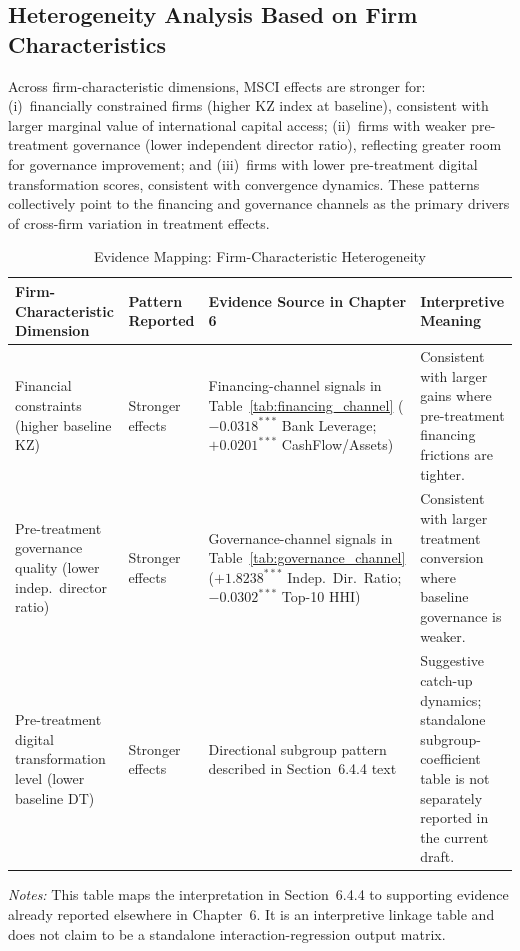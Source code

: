 \subsection{Heterogeneity Analysis Based on Firm Characteristics}

Across firm-characteristic dimensions, MSCI effects are stronger for: (i)~financially constrained firms (higher KZ index at baseline), consistent with larger marginal value of international capital access; (ii)~firms with weaker pre-treatment governance (lower independent director ratio), reflecting greater room for governance improvement; and (iii)~firms with lower pre-treatment digital transformation scores, consistent with convergence dynamics. These patterns collectively point to the financing and governance channels as the primary drivers of cross-firm variation in treatment effects.

\begin{table}[htbp]
\centering
\caption{Evidence Mapping: Firm-Characteristic Heterogeneity}
\label{tab:firm_characteristic_heterogeneity}
\small
\setlength{\tabcolsep}{4pt}
\begin{tabularx}{\textwidth}{>{\raggedright\arraybackslash}p{}>{\centering\arraybackslash}p{}>{\raggedright\arraybackslash}p{}>{\raggedright\arraybackslash}X}
\toprule
\textbf{Firm-Characteristic Dimension} & \textbf{Pattern Reported} & \textbf{Evidence Source in Chapter 6} & \textbf{Interpretive Meaning} \\
\midrule
Financial constraints (higher baseline KZ) & Stronger effects & Financing-channel signals in Table~\ref{tab:financing_channel} ($-0.0318^{***}$ Bank Leverage; $+0.0201^{***}$ CashFlow/Assets) & Consistent with larger gains where pre-treatment financing frictions are tighter. \\
Pre-treatment governance quality (lower indep.\ director ratio) & Stronger effects & Governance-channel signals in Table~\ref{tab:governance_channel} ($+1.8238^{***}$ Indep.\ Dir.\ Ratio; $-0.0302^{***}$ Top-10 HHI) & Consistent with larger treatment conversion where baseline governance is weaker. \\
Pre-treatment digital transformation level (lower baseline DT) & Stronger effects & Directional subgroup pattern described in Section~6.4.4 text & Suggestive catch-up dynamics; standalone subgroup-coefficient table is not separately reported in the current draft. \\
\bottomrule
\end{tabularx}
\begin{tablenotes}
\small
\item \textit{Notes:} This table maps the interpretation in Section~6.4.4 to supporting evidence already reported elsewhere in Chapter~6. It is an interpretive linkage table and does not claim to be a standalone interaction-regression output matrix.
\end{tablenotes}
\end{table}

